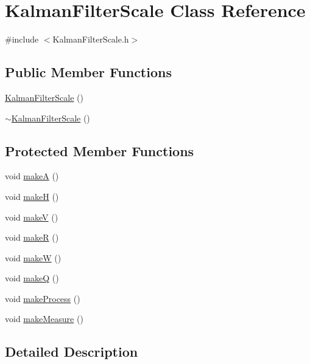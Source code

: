 \hypertarget{classKalmanFilterScale}{\section{\-Kalman\-Filter\-Scale \-Class \-Reference}
\label{classKalmanFilterScale}
}


{\ttfamily \#include $<$\-Kalman\-Filter\-Scale.\-h$>$}

\subsection*{\-Public \-Member \-Functions}
\begin{DoxyCompactItemize}
\item 
\hyperlink{classKalmanFilterScale_a2ddb2f510c2103920578bc51eb68574a}{\-Kalman\-Filter\-Scale} ()
\item 
\hyperlink{classKalmanFilterScale_a8ef5be565bd60a2027281473aecb7165}{$\sim$\-Kalman\-Filter\-Scale} ()
\end{DoxyCompactItemize}
\subsection*{\-Protected \-Member \-Functions}
\begin{DoxyCompactItemize}
\item 
void \hyperlink{classKalmanFilterScale_a2f543d979f7bedf714a4c6c6d0415a80}{make\-A} ()
\item 
void \hyperlink{classKalmanFilterScale_a9886fe7b723b1fe52a1b2fb09173cd6a}{make\-H} ()
\item 
void \hyperlink{classKalmanFilterScale_a5a305054267cfa4fb024551fe7bee7cc}{make\-V} ()
\item 
void \hyperlink{classKalmanFilterScale_aeb8f6250967beb55f4866e52fc6fe23d}{make\-R} ()
\item 
void \hyperlink{classKalmanFilterScale_a4f39209d09cada363a3848b3692eb0a1}{make\-W} ()
\item 
void \hyperlink{classKalmanFilterScale_a63d9966037b59c269bf86cf7254d4cb3}{make\-Q} ()
\item 
void \hyperlink{classKalmanFilterScale_a374bdda07afcf771760e0c4eda59de36}{make\-Process} ()
\item 
void \hyperlink{classKalmanFilterScale_aa34bc5ba7de5485d08583df61a057878}{make\-Measure} ()
\end{DoxyCompactItemize}


\subsection{\-Detailed \-Description}


